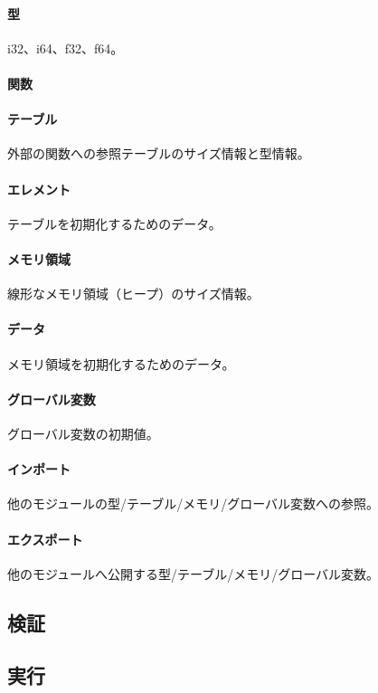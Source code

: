 \paragraph{型}

i32、i64、f32、f64。

\paragraph{関数}

\paragraph{テーブル}

外部の関数への参照テーブルのサイズ情報と型情報。

\paragraph{エレメント}

テーブルを初期化するためのデータ。

\paragraph{メモリ領域}

線形なメモリ領域（ヒープ）のサイズ情報。

\paragraph{データ}

メモリ領域を初期化するためのデータ。

\paragraph{グローバル変数}

グローバル変数の初期値。

\paragraph{インポート}

他のモジュールの型/テーブル/メモリ/グローバル変数への参照。

\paragraph{エクスポート}

他のモジュールへ公開する型/テーブル/メモリ/グローバル変数。

\subsection{検証}

\subsection{実行}
